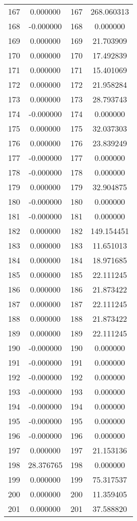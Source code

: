 \documentclass[12pt]{article}
\begin{document}
\begin{longtable}{@{}cccc@{}}
167 & 0.000000 & 167 & 268.060313 \\
168 & -0.000000 & 168 & 0.000000 \\
169 & 0.000000 & 169 & 21.703909 \\
170 & 0.000000 & 170 & 17.492839 \\
171 & 0.000000 & 171 & 15.401069 \\
172 & 0.000000 & 172 & 21.958284 \\
173 & 0.000000 & 173 & 28.793743 \\
174 & -0.000000 & 174 & 0.000000 \\
175 & 0.000000 & 175 & 32.037303 \\
176 & 0.000000 & 176 & 23.839249 \\
177 & -0.000000 & 177 & 0.000000 \\
178 & -0.000000 & 178 & 0.000000 \\
179 & 0.000000 & 179 & 32.904875 \\
180 & -0.000000 & 180 & 0.000000 \\
181 & -0.000000 & 181 & 0.000000 \\
182 & 0.000000 & 182 & 149.154451 \\
183 & 0.000000 & 183 & 11.651013 \\
184 & 0.000000 & 184 & 18.971685 \\
185 & 0.000000 & 185 & 22.111245 \\
186 & 0.000000 & 186 & 21.873422 \\
187 & 0.000000 & 187 & 22.111245 \\
188 & 0.000000 & 188 & 21.873422 \\
189 & 0.000000 & 189 & 22.111245 \\
190 & -0.000000 & 190 & 0.000000 \\
191 & -0.000000 & 191 & 0.000000 \\
192 & -0.000000 & 192 & 0.000000 \\
193 & -0.000000 & 193 & 0.000000 \\
194 & -0.000000 & 194 & 0.000000 \\
195 & -0.000000 & 195 & 0.000000 \\
196 & -0.000000 & 196 & 0.000000 \\
197 & 0.000000 & 197 & 21.153136 \\
198 & 28.376765 & 198 & 0.000000 \\
199 & 0.000000 & 199 & 75.317537 \\
200 & 0.000000 & 200 & 11.359405 \\
201 & 0.000000 & 201 & 37.588820 \\

\end{longtable}
\end{document}
